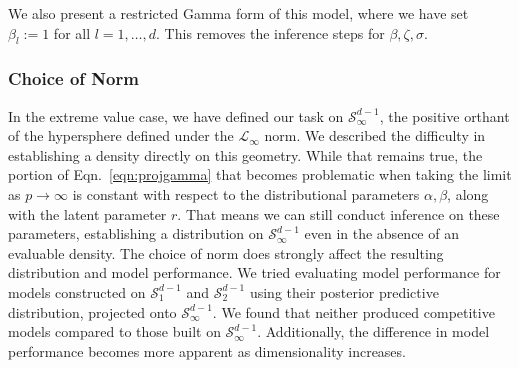 We also present a restricted Gamma form of this model, where we have set $\beta_l := 1$ for all
  $l = 1,\ldots,d$.  This removes the inference steps for $\beta,\zeta,\sigma$.


\subsubsection{Choice of Norm}
In the extreme value case, we have defined our task on $\mathcal{S}_{\infty}^{d-1}$, the positive orthant
  of the hypersphere defined under the $\mathcal{L}_{\infty}$ norm.  We described the difficulty in
  establishing a density directly on this geometry.
  While that remains true, the portion of
  Eqn.~\ref{eqn:projgamma} that becomes problematic when taking the limit as $p\to\infty$ is constant
  with respect to the distributional parameters $\alpha,\beta$, along with the latent parameter $r$.
  That means we can still conduct inference on these parameters, establishing a distribution on
  $\mathcal{S}_{\infty}^{d-1}$ even in the absence of an evaluable density.   The choice of norm does
  strongly affect the resulting distribution and model performance.  We tried evaluating model performance
  for models constructed on $\mathcal{S}_1^{d-1}$ and $\mathcal{S}_2^{d-1}$ using their posterior
  predictive distribution, projected onto $\mathcal{S}_{\infty}^{d-1}$.  We found that neither produced
  competitive models compared to those built on $\mathcal{S}_{\infty}^{d-1}$.  Additionally, the
  difference in model performance becomes more apparent as dimensionality increases.





